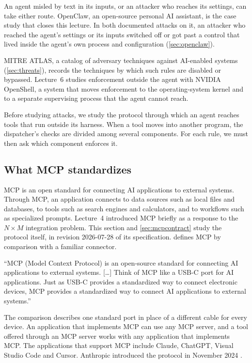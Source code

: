 An agent misled by text in its inputs, or an attacker who reaches its settings, can take either
route. OpenClaw, an open-source personal AI assistant, is the case study that closes this lecture.
In both documented attacks on it, an attacker who reached the agent's settings or its inputs switched
off or got past a control that lived inside the agent's own process and configuration
(\cref{sec:openclaw}).

MITRE ATLAS, a catalog of adversary techniques against AI-enabled systems (\cref{sec:threats}),
records the techniques by which such rules are disabled or bypassed. Lecture~6 studies enforcement
outside the agent with NVIDIA OpenShell, a system that moves enforcement to the operating-system
kernel and to a separate supervising process that the agent cannot reach.

Before studying attacks, we study the protocol through which an agent reaches tools that run outside
its harness. When a tool moves into another program, the dispatcher's checks are divided among
several components. For each rule, we must then ask which component enforces it.

\subsection{What MCP standardizes}
\label{sec:mcp-what}

MCP is an open standard for connecting AI applications to external systems. Through MCP, an
application connects to data sources such as local files and databases, to tools such as search
engines and calculators, and to workflows such as specialized prompts. Lecture~4 introduced MCP
briefly as a response to the $N \times M$ integration problem. This section and
\cref{sec:mcpcontract} study the protocol itself, in revision 2026-07-28 of its specification.
 defines MCP by comparison with a familiar connector.

\begin{definition}
\label{def:mcp}
``MCP (Model Context Protocol) is an open-source standard for connecting AI applications to external
systems. [\ldots] Think of MCP like a USB-C port for AI applications. Just as USB-C provides a
standardized way to connect electronic devices, MCP provides a standardized way to connect AI
applications to external systems.'' \citep{mcp-intro}
\end{definition}

The comparison describes one standard port in place of a different cable for every device. An
application that implements MCP can use any MCP server, and a tool offered through an MCP server
works with any application that implements MCP. The applications that support MCP include Claude,
ChatGPT, Visual Studio Code and Cursor. Anthropic introduced the protocol in November 2024
\citep{anthropic2024mcp}.

